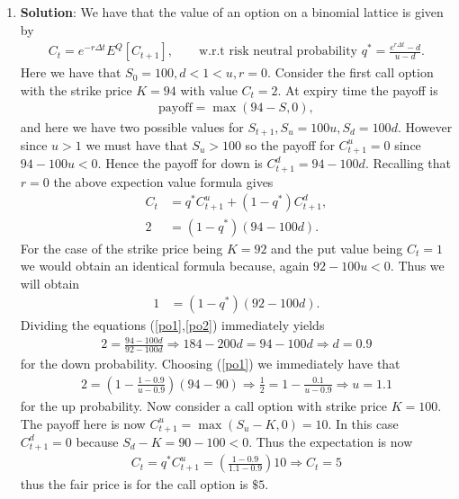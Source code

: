 \documentclass[10pt,english]{article}
\theoremstyle{plain}
\begin{document}
\begin{enumerate}
\item \textbf{Solution}: We have that the value of an option on a binomial lattice is given by
\begin{align*}
C_{t} = e^{-r\Delta t}E^{Q}[C_{t+1}], \qquad \text{w.r.t risk neutral probability } q^{*}=\frac{e^{r\Delta t}-d}{u-d}.
\end{align*}
Here we have that $S_{0}=100, d<1<u, r=0$. Consider the first call option with the strike price $K=94$ with value $C_{t}=2$. At expiry time the payoff is
\begin{align*}
\text{payoff}=\max(94-S,0),
\end{align*}
and here we have two possible values for $S_{t+1}, S_{u}=100u, S_{d}=100d$. However since $u>1$ we must have that $S_{u}>100$ so the payoff for $C_{t+1}^{u}=0$ since $94-100u < 0$. Hence the payoff for down is $C_{t+1}^{d}=94-100d$. Recalling that $r=0$ the above expection value formula gives
\begin{align}
C_{t} &= q^{*}C_{t+1}^{u} + (1-q^{*})C_{t+1}^{d},\nonumber\\
2 &= (1-q^{*})(94-100d).\label{po1}
\end{align}
For the case of the strike price being $K=92$ and the put value being $C_{t}=1$ we would obtain an identical formula because, again $92-100u<0$. Thus we will obtain
\begin{align}
1 &= (1-q^{*})(92-100d).\label{po2}
\end{align}
Dividing the equations (\ref{po1},\ref{po2}) immediately yields
\begin{align}
2 = \frac{94-100d}{92-100d} \Rightarrow 184 - 200d = 94-100d \Rightarrow \boxed{d=0.9}
\end{align}
for the down probability.  Choosing (\ref{po1}) we immediately have that
\begin{align}
2 = \left(1-\frac{1-0.9}{u-0.9}\right)(94-90) \Rightarrow \frac{1}{2}=1-\frac{0.1}{u-0.9}\Rightarrow \boxed{u=1.1}
\end{align}
for the up probability. Now consider a call option with strike price $K=100$. The payoff here is now $C_{t+1}^{u}=\max(S_{u}-K,0)=10$. In this case $C_{t+1}^{d}=0$ because $S_{d}-K=90-100<0$. Thus the expectation is now
\begin{align}
C_{t} = q^{*}C^{u}_{t+1} = \left(\frac{1-0.9}{1.1-0.9}\right)10 \Rightarrow \boxed{C_{t}=5}
\end{align}
thus the fair price is for the call option is $\$5$.


\end{enumerate}
\end{document}
